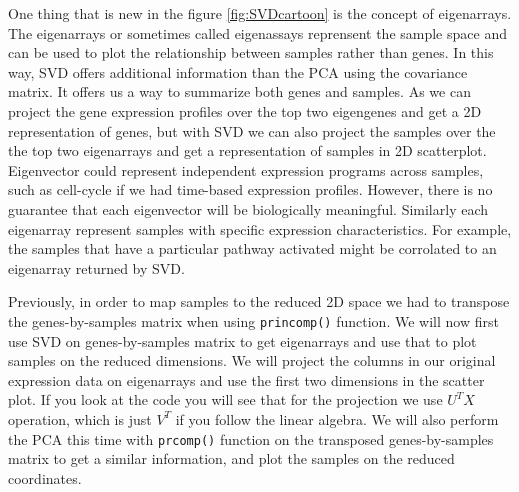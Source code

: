 \documentclass[12pt,]{krantz}
\begin{document}
One thing that is new in the figure \ref{fig:SVDcartoon} is the concept of eigenarrays. The eigenarrays or sometimes called eigenassays reprensent the sample space and can be used to plot the relationship between samples rather than genes. In this way, SVD offers additional information than the PCA using the covariance matrix. It offers us a way to summarize both genes and samples. As we can project the gene expression profiles over the top two eigengenes and get a 2D representation of genes, but with SVD we can also project the samples over the the top two eigenarrays and get a representation of samples in 2D scatterplot. Eigenvector could represent independent expression programs across samples, such as cell-cycle if we had time-based expression profiles. However, there is no guarantee that each eigenvector will be biologically meaningful. Similarly each eigenarray represent samples with specific expression characteristics. For example, the samples that have a particular pathway activated might be corrolated to an eigenarray returned by SVD.

Previously, in order to map samples to the reduced 2D space we had to transpose the genes-by-samples matrix when using \texttt{princomp()} function. We will now first use SVD on genes-by-samples matrix to get eigenarrays and use that to plot samples on the reduced dimensions. We will project the columns in our original expression data on eigenarrays and use the first two dimensions in the scatter plot. If you look at the code you will see that for the projection we use \(U^T X\) operation, which is just \(V^T\) if you follow the linear algebra. We will also perform the PCA this time with \texttt{prcomp()} function on the transposed genes-by-samples matrix to get a similar information, and plot the samples on the reduced coordinates.
\end{document}
